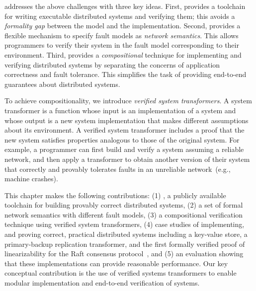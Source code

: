 \Verdi addresses the above challenges with three key ideas.
%
First, \Verdi provides a \Coq toolchain for writing executable distributed
systems and verifying them; this avoids a \emph{formality gap} between the
model and the implementation.
%
Second, \Verdi provides a flexible mechanism to specify fault models as
\emph{network semantics}.
%
This allows programmers to verify their system in the fault model
corresponding to their environment.
%
Third, \Verdi provides a \emph{compositional} technique for
implementing and verifying distributed systems by separating the
concerns of application correctness and fault tolerance.
%
This simplifies the task of providing end-to-end guarantees about
distributed systems.

To achieve compositionality, we introduce \textit{verified
system transformers}.
%
A system transformer is a function whose input is an
implementation of a system and whose output is a new system implementation that
makes different assumptions about its environment.
%
A verified system transformer
includes a proof that the new system
satisfies properties analogous to those of the original system.
%
For example, a \Verdi programmer can first build and verify a system
assuming a reliable network, and then apply a transformer to obtain
another version of their system that correctly and provably
tolerates faults in an unreliable network~(e.g., machine crashes).

%
%
%


This chapter makes the following contributions:
%
(1) \Verdi, a publicly available~\cite{verdi-repo} toolchain for
building provably correct distributed systems,
%
(2) a set of formal network semantics with different fault models,
%
(3) a compositional verification technique using verified system
transformers,
%
(4) case studies of implementing, and proving correct, practical
distributed systems including a key-value store, a primary-backup
replication transformer, and the first formally verified proof of
linearizability for the Raft consensus protocol~\cite{ongaro:raft},
%
and (5) an evaluation showing that these implementations
can provide reasonable performance.
%
Our key conceptual contribution is the use of verified
systems transformers to enable modular implementation and end-to-end
verification of systems.

